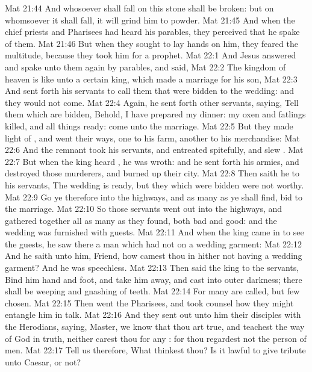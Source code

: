 \vs Mat 21:44 And whosoever shall fall on this stone shall be broken: but on whomsoever it shall fall, it will grind him to powder.
\vs Mat 21:45 And when the chief priests and Pharisees had heard his parables, they perceived that he spake of them.
\vs Mat 21:46 But when they sought to lay hands on him, they feared the multitude, because they took him for a prophet.
\vs Mat 22:1 And Jesus answered and spake unto them again by parables, and said,
\vs Mat 22:2 The kingdom of heaven is like unto a certain king, which made a marriage for his son,
\vs Mat 22:3 And sent forth his servants to call them that were bidden to the wedding: and they would not come.
\vs Mat 22:4 Again, he sent forth other servants, saying, Tell them which are bidden, Behold, I have prepared my dinner: my oxen and  fatlings  killed, and all things  ready: come unto the marriage.
\vs Mat 22:5 But they made light of , and went their ways, one to his farm, another to his merchandise:
\vs Mat 22:6 And the remnant took his servants, and entreated  spitefully, and slew .
\vs Mat 22:7 But when the king heard , he was wroth: and he sent forth his armies, and destroyed those murderers, and burned up their city.
\vs Mat 22:8 Then saith he to his servants, The wedding is ready, but they which were bidden were not worthy.
\vs Mat 22:9 Go ye therefore into the highways, and as many as ye shall find, bid to the marriage.
\vs Mat 22:10 So those servants went out into the highways, and gathered together all as many as they found, both bad and good: and the wedding was furnished with guests.
\vs Mat 22:11 And when the king came in to see the guests, he saw there a man which had not on a wedding garment:
\vs Mat 22:12 And he saith unto him, Friend, how camest thou in hither not having a wedding garment? And he was speechless.
\vs Mat 22:13 Then said the king to the servants, Bind him hand and foot, and take him away, and cast  into outer darkness; there shall be weeping and gnashing of teeth.
\vs Mat 22:14 For many are called, but few  chosen.
\vs Mat 22:15 Then went the Pharisees, and took counsel how they might entangle him in  talk.
\vs Mat 22:16 And they sent out unto him their disciples with the Herodians, saying, Master, we know that thou art true, and teachest the way of God in truth, neither carest thou for any : for thou regardest not the person of men.
\vs Mat 22:17 Tell us therefore, What thinkest thou? Is it lawful to give tribute unto Caesar, or not?
